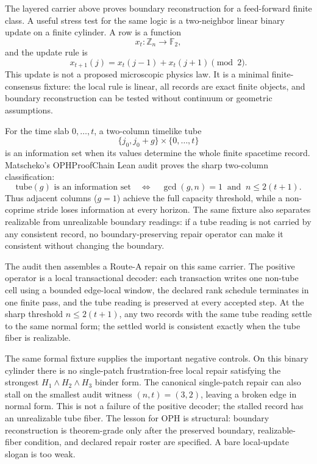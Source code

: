 \documentclass[11pt]{article}
\theoremstyle{remark}
\theoremstyle{plain}
\begin{document}
The layered carrier above proves boundary reconstruction for a feed-forward
finite class.  A useful stress test for the same logic is a two-neighbor
linear binary update on a finite cylinder.  A row is a function
\[
x_t:\mathbb Z_n\to\mathbb F_2,
\]
and the update rule is
\[
x_{t+1}(j)=x_t(j-1)+x_t(j+1)\pmod 2.
\]
This update is not a proposed microscopic physics law.  It is a minimal
finite-consensus fixture: the local rule is linear, all records are exact
finite objects, and boundary reconstruction can be tested without continuum or
geometric assumptions.

For the time slab \(0,\ldots,t\), a two-column timelike tube
\[
\{j_0,j_0+g\}\times\{0,\ldots,t\}
\]
is an information set when its values determine the whole finite spacetime
record.  Matscheko's OPHProofChain Lean audit proves the sharp two-column
classification:
\[
\text{tube}(g)\text{ is an information set}
\quad\Longleftrightarrow\quad
\gcd(g,n)=1\ \text{ and }\ n\le 2(t+1).
\]
Thus adjacent columns (\(g=1\)) achieve the full capacity threshold, while a
non-coprime stride loses information at every horizon.  The same fixture also
separates realizable from unrealizable boundary readings: if a tube reading is
not carried by any consistent record, no boundary-preserving repair
operator can make it consistent without changing the boundary.

The audit then assembles a Route-A repair on this same carrier.  The positive
operator is a local transactional decoder: each transaction writes one
non-tube cell using a bounded edge-local window, the declared rank schedule
terminates in one finite pass, and the tube reading is preserved at every
accepted step.  At the sharp threshold \(n\le2(t+1)\), any two records with
the same tube reading settle to the same normal form; the settled world is
consistent exactly when the tube fiber is realizable.

The same formal fixture supplies the important negative controls.  On this
binary cylinder there is no single-patch frustration-free local repair
satisfying the strongest \(H_1\wedge H_2\wedge H_3\) binder form.  The
canonical single-patch repair can also stall on the smallest audit witness
\((n,t)=(3,2)\), leaving a broken edge in normal form.  This is not a failure
of the positive decoder; the stalled record has an unrealizable tube fiber.
The lesson for OPH is structural: boundary reconstruction is theorem-grade
only after the preserved boundary, realizable-fiber condition, and declared
repair roster are specified.  A bare local-update slogan is too weak.
\end{document}
